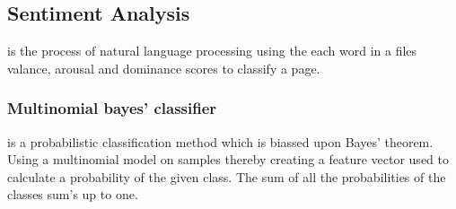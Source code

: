 \subsection{Sentiment Analysis}
is the process of natural language processing using the each word in a files valance, arousal  and dominance scores to classify a page.

\subsubsection{Multinomial bayes' classifier} is a probabilistic classification method which is biassed upon Bayes' theorem. Using a multinomial model on samples thereby creating a feature vector used to calculate a probability of the given class. The sum of all the probabilities of the classes sum's up to one.